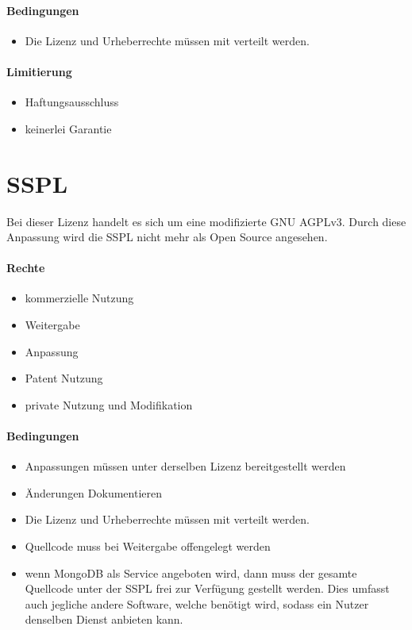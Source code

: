 \paragraph{Bedingungen}
\begin{itemize}
    \item Die Lizenz und Urheberrechte müssen mit verteilt werden.
\end{itemize}

\paragraph{Limitierung}
\begin{itemize}
    \item Haftungsausschluss
    \item keinerlei Garantie
\end{itemize}


\section{\acf{SSPL}}\label{sec:server-side-public-license}
Bei dieser Lizenz handelt es sich um eine modifizierte GNU AGPLv3.
Durch diese Anpassung wird die \ac{SSPL} nicht mehr als Open Source angesehen.\cite{osi-sspl}

\paragraph{Rechte}
\begin{itemize}
    \item kommerzielle Nutzung
    \item Weitergabe
    \item Anpassung
    \item Patent Nutzung
    \item private Nutzung und Modifikation
\end{itemize}
\paragraph{Bedingungen}
\begin{itemize}
    \item Anpassungen müssen unter derselben Lizenz bereitgestellt werden
    \item Änderungen Dokumentieren
    \item Die Lizenz und Urheberrechte müssen mit verteilt werden.
    \item Quellcode muss bei Weitergabe offengelegt werden
    \item wenn MongoDB als Service angeboten wird, dann muss der gesamte Quellcode unter der
    \ac{SSPL} frei zur Verfügung gestellt werden.
    Dies umfasst auch jegliche andere Software, welche benötigt wird, sodass ein Nutzer denselben Dienst anbieten kann.
\end{itemize}

